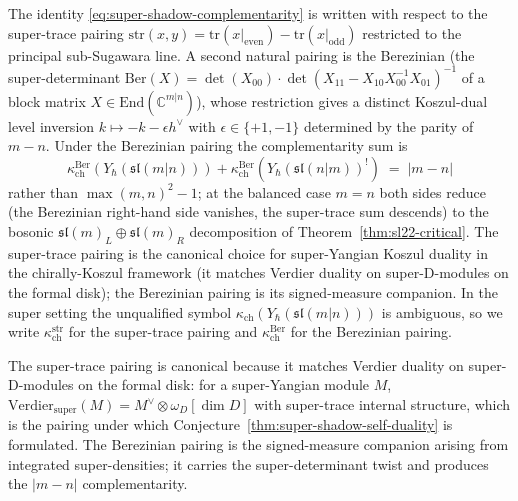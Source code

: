 \begin{remark}
\label{rem:super-complementarity-canonical-pairing}
The identity \eqref{eq:super-shadow-complementarity} is written with
respect to the super-trace pairing
$\mathrm{str}(x, y) = \mathrm{tr}(x|_{\text{even}})
 - \mathrm{tr}(x|_{\text{odd}})$ restricted to the principal
sub-Sugawara line. A second natural pairing is the Berezinian
(the super-determinant $\mathrm{Ber}(X) = \det(X_{00})
\cdot \det(X_{11} - X_{10}X_{00}^{-1}X_{01})^{-1}$ of a block matrix
$X \in \mathrm{End}(\mathbb{C}^{m|n})$), whose restriction gives a
distinct Koszul-dual
level inversion $k \mapsto -k - \epsilon h^\vee$ with
$\epsilon \in \{+1, -1\}$ determined by the parity of $m - n$. Under
the Berezinian pairing the complementarity sum is
\[
 \kappa_{\mathrm{ch}}^{\mathrm{Ber}}(Y_\hbar(\mathfrak{sl}(m|n))) +
 \kappa_{\mathrm{ch}}^{\mathrm{Ber}}(Y_\hbar(\mathfrak{sl}(n|m))^!) \;=\;
 \lvert m - n \rvert
\]
rather than $\max(m, n)^2 - 1$; at the balanced case $m = n$ both
sides reduce (the Berezinian right-hand side vanishes, the super-trace
sum descends) to the bosonic
$\mathfrak{sl}(m)_L \oplus \mathfrak{sl}(m)_R$ decomposition of
Theorem~\ref{thm:sl22-critical}. The super-trace pairing is the
canonical choice for super-Yangian Koszul duality in the
chirally-Koszul framework (it matches Verdier duality on
super-D-modules on the formal disk); the Berezinian pairing is its
signed-measure companion. In the super setting the unqualified symbol
$\kappa_{\mathrm{ch}}(Y_\hbar(\mathfrak{sl}(m|n)))$ is ambiguous, so we write
$\kappa_{\mathrm{ch}}^{\mathrm{str}}$
for the super-trace pairing and $\kappa_{\mathrm{ch}}^{\mathrm{Ber}}$
for the Berezinian pairing.
\end{remark}

\begin{remark}
\label{rem:verdier-super-pairing}
The super-trace pairing is canonical because it matches Verdier
duality on super-D-modules on the formal disk: for a super-Yangian
module $M$, $\mathrm{Verdier}_{\text{super}}(M) = M^\vee \otimes
\omega_D[\dim D]$ with super-trace internal structure, which is the
pairing under which Conjecture~\ref{thm:super-shadow-self-duality}
is formulated. The Berezinian pairing is the signed-measure companion
arising from integrated super-densities; it carries the
super-determinant twist and produces the $|m - n|$ complementarity.
\end{remark}

